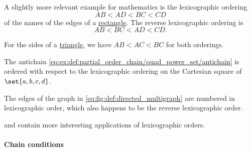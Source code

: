 \begin{example}
\begin{thmenum}
     A slightly more relevant example for mathematics is the lexicographic ordering
    \begin{equation*}
      AB < AD < BC < CD
    \end{equation*}
    of the names of the edges of a \hyperref[def:parallelogram/rectangle]{rectangle}. The reverse lexicographic ordering is
    \begin{equation*}
      AB < BC < AD < CD.
    \end{equation*}

     For the sides of a \hyperref[def:triangle]{triangle}, we have \( AB < AC < BC \) for both orderings.

     The antichain \eqref{eq:ex:def:partial_order_chain/quad_power_set/antichain} is ordered with respect to the lexicographic ordering on the Cartesian square of \( \set{ a, b, c, d } \).

     The edges of the graph in \eqref{eq:fig:def:directed_multigraph} are numbered in lexicographic order, which also happens to be the reverse lexicographic order.

      and  contain more interesting applications of lexicographic orders.
  \end{thmenum}
\end{example}

\paragraph{Chain conditions}

